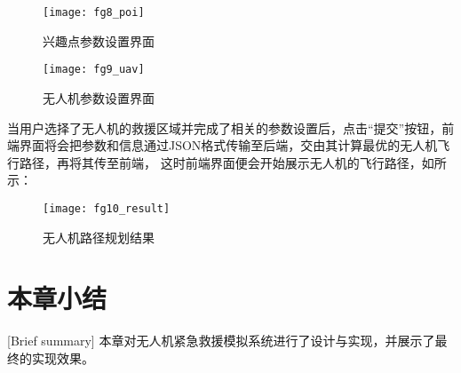\begin{figure}[H]
	\centering
	\texttt{[image: fg8\_poi]}
	\caption{兴趣点参数设置界面}
	\label{fg603}
\end{figure}
\begin{figure}[H]
	\centering
	\texttt{[image: fg9\_uav]}
	\caption{无人机参数设置界面}
	\label{fg604}
\end{figure}
当用户选择了无人机的救援区域并完成了相关的参数设置后，点击“提交”按钮，前端界面将会把参数和信息通过JSON格式传输至后端，交由其计算最优的无人机飞行路径，再将其传至前端，
这时前端界面便会开始展示无人机的飞行路径，如所示：
\begin{figure}[H]
	\centering
	\texttt{[image: fg10\_result]}
	\caption{无人机路径规划结果}
	\label{fg605}
\end{figure}
\section{本章小结}[Brief summary]
本章对无人机紧急救援模拟系统进行了设计与实现，并展示了最终的实现效果。